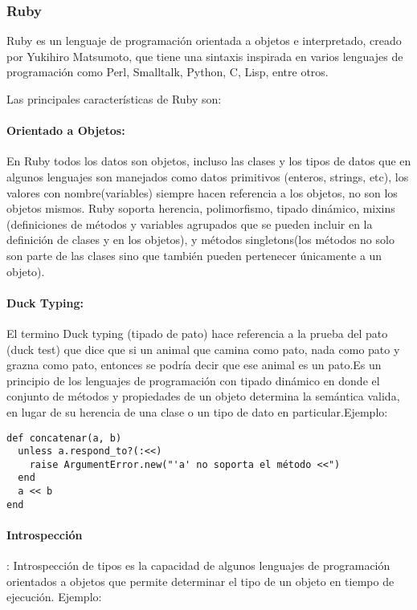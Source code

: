 \subsubsection*{Ruby \cite{ruby_lang} }
\label{tec:ruby}

Ruby es un lenguaje de programación orientada a objetos e interpretado, creado por Yukihiro Matsumoto, que tiene una sintaxis inspirada en varios lenguajes de programación como Perl, Smalltalk, Python, C, Lisp, entre otros.

Las principales características de Ruby son:

\paragraph{Orientado a Objetos:}
En Ruby todos los datos son objetos, incluso las clases y los tipos de datos que en algunos lenguajes son manejados como datos primitivos (enteros, strings, etc), los valores con nombre(variables) siempre hacen referencia a los objetos, no son los objetos mismos. \newline Ruby soporta herencia, polimorfismo, tipado dinámico, mixins (definiciones de métodos y variables agrupados que se pueden incluir en la definición de clases y en los objetos), y métodos singletons(los métodos no solo son parte de las clases sino que también pueden pertenecer únicamente a un objeto).

\paragraph{Duck Typing:}
El termino Duck typing (tipado de pato) hace referencia a la prueba del pato (duck test) que dice que si un animal que camina como pato, nada como pato y grazna como pato, entonces se podría decir que ese animal es un pato.\newline Es un principio de los lenguajes de programación con tipado dinámico en donde el conjunto de métodos y propiedades de un objeto determina la semántica valida, en lugar de su herencia de una clase o un tipo de dato en particular.\newline Ejemplo:

\begin{verbatim}
def concatenar(a, b)
  unless a.respond_to?(:<<)
    raise ArgumentError.new("'a' no soporta el método <<")
  end
  a << b
end
\end{verbatim}

\paragraph{Introspección}:
Introspección de tipos es la capacidad de algunos lenguajes de programación orientados a objetos que permite determinar el tipo de un objeto en tiempo de ejecución. \newline Ejemplo:

